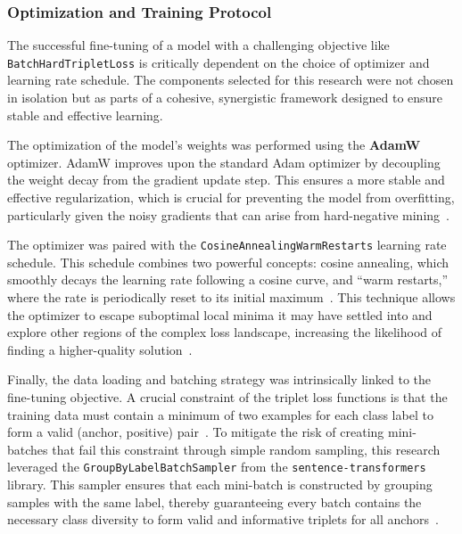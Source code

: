 \subsubsection{Optimization and Training Protocol}\label{ch:3.3.1.3}
The successful fine-tuning of a model with a challenging objective like \verb|BatchHardTripletLoss| is critically dependent on the choice of optimizer and learning rate schedule. The components selected for this research were not chosen in isolation but as parts of a cohesive, synergistic framework designed to ensure stable and effective learning.{\setlength{\emergencystretch}{5em}\par}

The optimization of the model's weights was performed using the \textbf{AdamW} optimizer. AdamW improves upon the standard Adam optimizer by decoupling the weight decay from the gradient update step. This ensures a more stable and effective regularization, which is crucial for preventing the model from overfitting, particularly given the noisy gradients that can arise from hard-negative mining~\cite{loshchilov2019decoupledweightdecayregularization}.

The optimizer was paired with the \verb|CosineAnnealingWarmRestarts| learning rate schedule. This schedule combines two powerful concepts: cosine annealing, which smoothly decays the learning rate following a cosine curve, and ``warm restarts,'' where the rate is periodically reset to its initial maximum~\cite{pytorchcosanneal}. This technique allows the optimizer to escape suboptimal local minima it may have settled into and explore other regions of the complex loss landscape, increasing the likelihood of finding a higher-quality solution~\cite{loshchilovhutter}.

Finally, the data loading and batching strategy was intrinsically linked to the fine-tuning objective. A crucial constraint of the triplet loss functions is that the training data must contain a minimum of two examples for each class label to form a valid (anchor, positive) pair~\cite{sbertLosses}. To mitigate the risk of creating mini-batches that fail this constraint through simple random sampling, this research leveraged the \verb|GroupByLabelBatchSampler| from the \verb|sentence-transformers| library. This sampler ensures that each mini-batch is constructed by grouping samples with the same label, thereby guaranteeing every batch contains the necessary class diversity to form valid and informative triplets for all anchors~\cite{sbertSamplers}.


